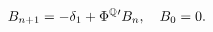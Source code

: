 \begin{equation} \label{eq:nAffineB}
	B_{n + 1} = - \delta_{1} + \Phi^{\mathbb{Q}}{'} B_{n} , \quad B_{0} = 0 .
\end{equation}